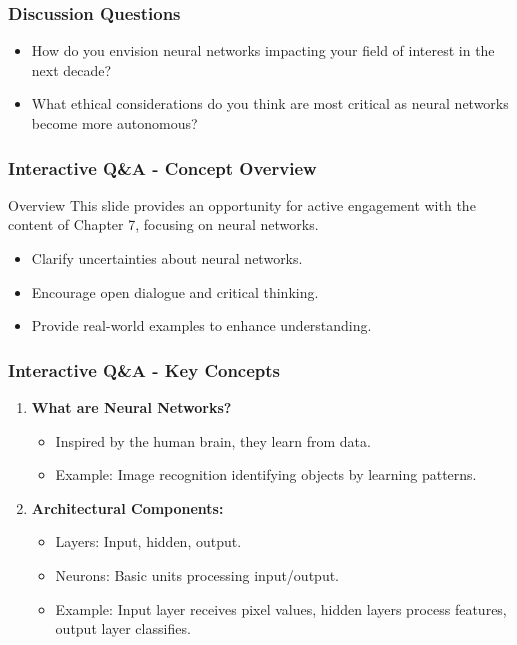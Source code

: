 \documentclass[aspectratio=169]{beamer}
\begin{document}
\begin{frame}[fragile]
    \frametitle{Discussion Questions}
    \begin{itemize}
        \item How do you envision neural networks impacting your field of interest in the next decade?
        \item What ethical considerations do you think are most critical as neural networks become more autonomous?
    \end{itemize}
\end{frame}

\begin{frame}[fragile]
    \frametitle{Interactive Q\&A - Concept Overview}
    \begin{block}{Overview}
        This slide provides an opportunity for active engagement with the content of Chapter 7, focusing on neural networks.
    \end{block}
    \begin{itemize}
        \item Clarify uncertainties about neural networks.
        \item Encourage open dialogue and critical thinking.
        \item Provide real-world examples to enhance understanding.
    \end{itemize}
\end{frame}

\begin{frame}[fragile]
    \frametitle{Interactive Q\&A - Key Concepts}
    \begin{enumerate}
        \item \textbf{What are Neural Networks?}
            \begin{itemize}
                \item Inspired by the human brain, they learn from data.
                \item Example: Image recognition identifying objects by learning patterns.
            \end{itemize}
        \item \textbf{Architectural Components:}
            \begin{itemize}
                \item Layers: Input, hidden, output.
                \item Neurons: Basic units processing input/output.
                \item Example: Input layer receives pixel values, hidden layers process features, output layer classifies.
            \end{itemize}
    \end{enumerate}
\end{frame}
\end{document}
